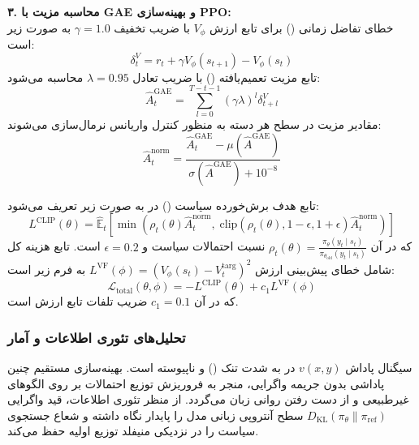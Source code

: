 \textbf{۳. محاسبه مزیت با GAE و بهینه‌سازی PPO:} \\
خطای تفاضل زمانی () برای تابع ارزش $V_\phi$ با ضریب تخفیف $\gamma = 1.0$ به صورت زیر است:
\begin{equation}
	\delta_t^V = r_t + \gamma V_\phi(s_{t+1}) - V_\phi(s_t)
\end{equation}
تابع مزیت تعمیم‌یافته () با ضریب تعادل $\lambda = 0.95$ محاسبه می‌شود:
\begin{equation}
	\hat{A}_t^{\text{GAE}} = \sum_{l=0}^{T-t-1} (\gamma \lambda)^l \delta_{t+l}^V
\end{equation}
مقادیر مزیت در سطح هر دسته به منظور کنترل واریانس نرمال‌سازی می‌شوند:
\begin{equation}
	\hat{A}_t^{\text{norm}} = \frac{\hat{A}_t^{\text{GAE}} - \mu(\hat{A}^{\text{GAE}})}{\sigma(\hat{A}^{\text{GAE}}) + 10^{-8}}
\end{equation}

تابع هدف برش‌خورده سیاست () در  به صورت زیر تعریف می‌شود:
\begin{equation}
	L^{\text{CLIP}}(\theta) = \hat{\mathbb{E}}_t \left[ \min \left( \rho_t(\theta) \hat{A}_t^{\text{norm}}, \; \text{clip}(\rho_t(\theta), 1-\epsilon, 1+\epsilon) \hat{A}_t^{\text{norm}} \right) \right]
\end{equation}
که در آن $\rho_t(\theta) = \frac{\pi_\theta(y_t \mid s_t)}{\pi_{\theta_{\text{old}}}(y_t \mid s_t)}$ نسبت احتمالات سیاست و $\epsilon = 0.2$ است. تابع هزینه کل شامل خطای پیش‌بینی ارزش $L^{\text{VF}}(\phi) = (V_\phi(s_t) - V_t^{\text{targ}})^2$ به فرم زیر است:
\begin{equation}
	\mathcal{L}_{\text{total}}(\theta, \phi) = -L^{\text{CLIP}}(\theta) + c_1 L^{\text{VF}}(\phi)
\end{equation}
که در آن $c_1 = 0.1$ ضریب تلفات تابع ارزش است.

\subsubsection*{تحلیل‌های تئوری اطلاعات و آمار}

سیگنال پاداش $v(x,y)$ در  به شدت تنک () و ناپیوسته است. بهینه‌سازی مستقیم چنین پاداشی بدون جریمه واگرایی، منجر به فروریزش توزیع احتمالات بر روی الگوهای غیرطبیعی و از دست رفتن روانی زبان می‌گردد. از منظر تئوری اطلاعات، قید واگرایی $D_{\text{KL}}(\pi_\theta \parallel \pi_{\text{ref}})$ سطح آنتروپی زبانی مدل را پایدار نگاه داشته و شعاع جستجوی سیاست را در نزدیکی منیفلد توزیع اولیه حفظ می‌کند.

